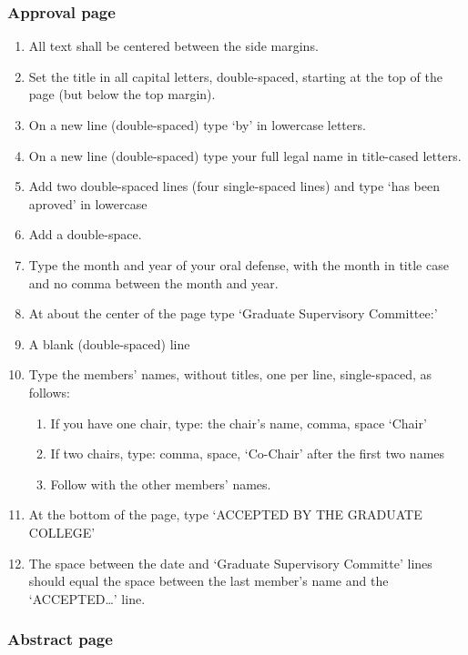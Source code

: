 \subsubsection{Approval page}

\begin{enumerate}
\item All text shall be centered between the side margins.

\item Set the title in all capital letters, double-spaced, 
starting at the top of the page (but below the top margin).
\item On a new line (double-spaced) type `by' in lowercase letters.
\item On a new line (double-spaced) type your full legal name in
title-cased letters.
\item Add two double-spaced lines (four single-spaced lines) and type
`has been aproved' in lowercase
\item Add a double-space.
\item Type the month and year of your oral defense, with the
month in title case and no comma between the month and year.

\item At about the center of the page type `Graduate Supervisory Committee:'
\item A blank (double-spaced) line
\item Type the members' names, without titles, one per line, 
      single-spaced, as follows:
  \begin{enumerate}
  \item If you have one chair, type: the chair's name, comma, space `Chair'
  \item If two chairs, type: comma, space, `Co-Chair' after the first two names
  \item Follow with the other members' names.
  \end{enumerate}
\item At the bottom of the page, type `ACCEPTED BY THE GRADUATE COLLEGE'
\item The space between the date and `Graduate Supervisory Committe' lines
should equal the space between the last member's name and the `ACCEPTED\ldots'
line.
\end{enumerate}

\subsubsection{Abstract page}

